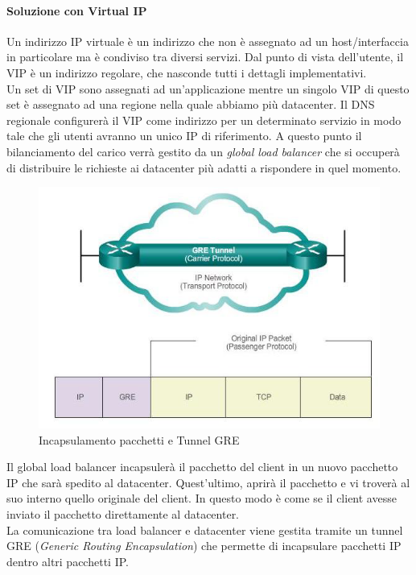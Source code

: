 \documentclass{article}
\begin{document}
\paragraph{Soluzione con Virtual IP}
Un indirizzo IP virtuale è un indirizzo che non è assegnato ad un host/interfaccia in particolare ma è condiviso tra diversi servizi. Dal punto di vista dell'utente, il VIP è un indirizzo regolare, che nasconde tutti i dettagli implementativi.\\
Un set di VIP sono assegnati ad un'applicazione mentre un singolo VIP di questo set è assegnato ad una regione nella quale abbiamo più datacenter. Il DNS regionale configurerà il VIP come indirizzo per un determinato servizio in modo tale che gli utenti avranno un unico IP di riferimento. A questo punto il bilanciamento del carico verrà gestito da un \textit{global load balancer} che si occuperà di distribuire le richieste ai datacenter più adatti a rispondere in quel momento.\\
\begin{figure}[H]
    \centering
    \includegraphics[scale=0.5]{img/gre.png}
    \caption{Incapsulamento pacchetti e Tunnel GRE}
\end{figure}\noindent
Il global load balancer incapsulerà il pacchetto del client in un nuovo pacchetto IP che sarà spedito al datacenter. Quest'ultimo, aprirà il pacchetto e vi troverà al suo interno quello originale del client. In questo modo è come se il client avesse inviato il pacchetto direttamente al datacenter.\\
La comunicazione tra load balancer e datacenter viene gestita tramite un tunnel GRE (\textit{Generic Routing Encapsulation}) che permette di incapsulare pacchetti IP dentro altri pacchetti IP.
\end{document}
